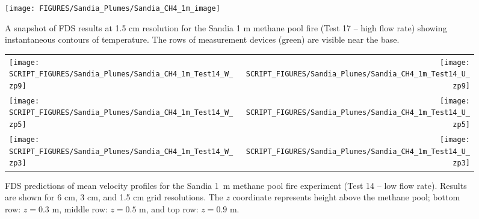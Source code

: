 \begin{figure}[h]
\begin{center}
\texttt{[image: FIGURES/Sandia\_Plumes/Sandia\_CH4\_1m\_image]}
\caption[Sandia 1~m methane pool fire instantaneous temperature contours]{A snapshot of FDS results at 1.5 cm resolution for the Sandia 1 m methane pool fire (Test 17 -- high flow rate) showing instantaneous contours of temperature.  The rows of measurement devices (green) are visible near the base.}
\label{Sandia_CH4_1m_image}
\end{center}
\end{figure}

\newpage

\begin{figure}[p]
\begin{tabular*}{\textwidth}{l@{\extracolsep{\fill}}r}
\texttt{[image: SCRIPT\_FIGURES/Sandia\_Plumes/Sandia\_CH4\_1m\_Test14\_W\_zp9]} &
\texttt{[image: SCRIPT\_FIGURES/Sandia\_Plumes/Sandia\_CH4\_1m\_Test14\_U\_zp9]} \\
\texttt{[image: SCRIPT\_FIGURES/Sandia\_Plumes/Sandia\_CH4\_1m\_Test14\_W\_zp5]} &
\texttt{[image: SCRIPT\_FIGURES/Sandia\_Plumes/Sandia\_CH4\_1m\_Test14\_U\_zp5]} \\
\texttt{[image: SCRIPT\_FIGURES/Sandia\_Plumes/Sandia\_CH4\_1m\_Test14\_W\_zp3]} &
\texttt{[image: SCRIPT\_FIGURES/Sandia\_Plumes/Sandia\_CH4\_1m\_Test14\_U\_zp3]}
\end{tabular*}
\caption[Sandia 1~m methane pool fire (Test 14) mean velocity profiles]
{FDS predictions of mean velocity profiles for the Sandia 1~m methane pool fire experiment (Test 14 -- low flow rate). Results are shown for 6 cm, 3 cm, and 1.5 cm grid resolutions. The $z$ coordinate represents height above the methane pool; bottom row: $z=0.3$ m, middle row: $z=0.5$ m, and top row: $z=0.9$ m.}
\label{Sandia_CH4_1m_Test14_velocity}
\end{figure}

